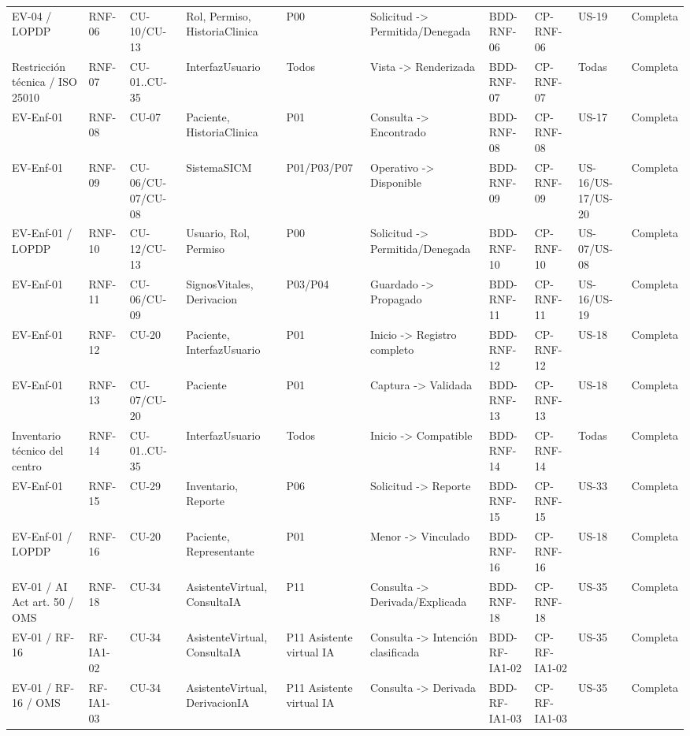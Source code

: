 \documentclass[11pt,a4paper]{article}
\begin{document}
\begin{appendices}
\begin{landscape}
\begin{longtable}{p{2.2cm}p{1.8cm}p{2cm}p{3cm}p{3cm}p{3cm}p{2cm}p{2cm}p{2cm}p{1.6cm}}
				EV-04 / LOPDP & RNF-06 & CU-10/CU-13 & Rol, Permiso, HistoriaClinica & P00 & Solicitud -> Permitida/Denegada & BDD-RNF-06 & CP-RNF-06 & US-19 & Completa\\
				Restricción técnica / ISO 25010 & RNF-07 & CU-01..CU-35 & InterfazUsuario & Todos & Vista -> Renderizada & BDD-RNF-07 & CP-RNF-07 & Todas & Completa\\
				EV-Enf-01 & RNF-08 & CU-07 & Paciente, HistoriaClinica & P01 & Consulta -> Encontrado & BDD-RNF-08 & CP-RNF-08 & US-17 & Completa\\
				EV-Enf-01 & RNF-09 & CU-06/CU-07/CU-08 & SistemaSICM & P01/P03/P07 & Operativo -> Disponible & BDD-RNF-09 & CP-RNF-09 & US-16/US-17/US-20 & Completa\\
				EV-Enf-01 / LOPDP & RNF-10 & CU-12/CU-13 & Usuario, Rol, Permiso & P00 & Solicitud -> Permitida/Denegada & BDD-RNF-10 & CP-RNF-10 & US-07/US-08 & Completa\\
				EV-Enf-01 & RNF-11 & CU-06/CU-09 & SignosVitales, Derivacion & P03/P04 & Guardado -> Propagado & BDD-RNF-11 & CP-RNF-11 & US-16/US-19 & Completa\\
				EV-Enf-01 & RNF-12 & CU-20 & Paciente, InterfazUsuario & P01 & Inicio -> Registro completo & BDD-RNF-12 & CP-RNF-12 & US-18 & Completa\\
				EV-Enf-01 & RNF-13 & CU-07/CU-20 & Paciente & P01 & Captura -> Validada & BDD-RNF-13 & CP-RNF-13 & US-18 & Completa\\
				Inventario técnico del centro & RNF-14 & CU-01..CU-35 & InterfazUsuario & Todos & Inicio -> Compatible & BDD-RNF-14 & CP-RNF-14 & Todas & Completa\\
				EV-Enf-01 & RNF-15 & CU-29 & Inventario, Reporte & P06 & Solicitud -> Reporte & BDD-RNF-15 & CP-RNF-15 & US-33 & Completa\\
				EV-Enf-01 / LOPDP & RNF-16 & CU-20 & Paciente, Representante & P01 & Menor -> Vinculado & BDD-RNF-16 & CP-RNF-16 & US-18 & Completa\\
				EV-01 / AI Act art. 50 / OMS & RNF-18 & CU-34 & AsistenteVirtual, ConsultaIA & P11 & Consulta -> Derivada/Explicada & BDD-RNF-18 & CP-RNF-18 & US-35 & Completa\\
				EV-01 / RF-16 & RF-IA1-02 & CU-34 & AsistenteVirtual, ConsultaIA & P11 Asistente virtual IA & Consulta -> Intención clasificada & BDD-RF-IA1-02 & CP-RF-IA1-02 & US-35 & Completa\\
				EV-01 / RF-16 / OMS & RF-IA1-03 & CU-34 & AsistenteVirtual, DerivacionIA & P11 Asistente virtual IA & Consulta -> Derivada & BDD-RF-IA1-03 & CP-RF-IA1-03 & US-35 & Completa\\

\end{longtable}
\end{landscape}
\end{appendices}
\end{document}
